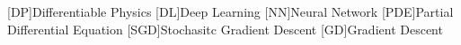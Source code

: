 [DP]{Differentiable Physics}
[DL]{Deep Learning}
[NN]{Neural Network}
[PDE]{Partial Differential Equation}
[SGD]{Stochasitc Gradient Descent}
[GD]{Gradient Descent}
